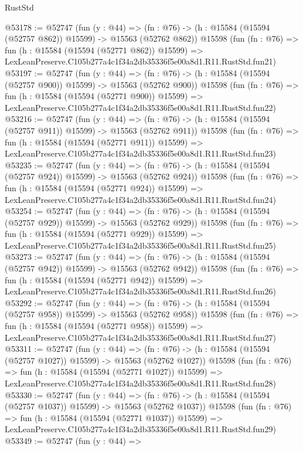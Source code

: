 \begin{lexlean}{RustStd}
\begin{coremodule}
@53178 := @52747
    (fun (y : @44) =>
    (fn : @76) -> (h : @15584 (@15594 (@52757 @862)) @15599) -> @15563 (@52762 @862))
    @15598
    (fun (fn : @76) =>
    fun (h : @15584 (@15594 (@52771 @862)) @15599) =>
    LexLeanPreserve.C105b277a4c1f34a2db35336f5e00a8d1.R11.RustStd.fun21)
@53197 := @52747
    (fun (y : @44) =>
    (fn : @76) -> (h : @15584 (@15594 (@52757 @900)) @15599) -> @15563 (@52762 @900))
    @15598
    (fun (fn : @76) =>
    fun (h : @15584 (@15594 (@52771 @900)) @15599) =>
    LexLeanPreserve.C105b277a4c1f34a2db35336f5e00a8d1.R11.RustStd.fun22)
@53216 := @52747
    (fun (y : @44) =>
    (fn : @76) -> (h : @15584 (@15594 (@52757 @911)) @15599) -> @15563 (@52762 @911))
    @15598
    (fun (fn : @76) =>
    fun (h : @15584 (@15594 (@52771 @911)) @15599) =>
    LexLeanPreserve.C105b277a4c1f34a2db35336f5e00a8d1.R11.RustStd.fun23)
@53235 := @52747
    (fun (y : @44) =>
    (fn : @76) -> (h : @15584 (@15594 (@52757 @924)) @15599) -> @15563 (@52762 @924))
    @15598
    (fun (fn : @76) =>
    fun (h : @15584 (@15594 (@52771 @924)) @15599) =>
    LexLeanPreserve.C105b277a4c1f34a2db35336f5e00a8d1.R11.RustStd.fun24)
@53254 := @52747
    (fun (y : @44) =>
    (fn : @76) -> (h : @15584 (@15594 (@52757 @929)) @15599) -> @15563 (@52762 @929))
    @15598
    (fun (fn : @76) =>
    fun (h : @15584 (@15594 (@52771 @929)) @15599) =>
    LexLeanPreserve.C105b277a4c1f34a2db35336f5e00a8d1.R11.RustStd.fun25)
@53273 := @52747
    (fun (y : @44) =>
    (fn : @76) -> (h : @15584 (@15594 (@52757 @942)) @15599) -> @15563 (@52762 @942))
    @15598
    (fun (fn : @76) =>
    fun (h : @15584 (@15594 (@52771 @942)) @15599) =>
    LexLeanPreserve.C105b277a4c1f34a2db35336f5e00a8d1.R11.RustStd.fun26)
@53292 := @52747
    (fun (y : @44) =>
    (fn : @76) -> (h : @15584 (@15594 (@52757 @958)) @15599) -> @15563 (@52762 @958))
    @15598
    (fun (fn : @76) =>
    fun (h : @15584 (@15594 (@52771 @958)) @15599) =>
    LexLeanPreserve.C105b277a4c1f34a2db35336f5e00a8d1.R11.RustStd.fun27)
@53311 := @52747
    (fun (y : @44) =>
    (fn : @76) -> (h : @15584 (@15594 (@52757 @1027)) @15599) -> @15563 (@52762 @1027))
    @15598
    (fun (fn : @76) =>
    fun (h : @15584 (@15594 (@52771 @1027)) @15599) =>
    LexLeanPreserve.C105b277a4c1f34a2db35336f5e00a8d1.R11.RustStd.fun28)
@53330 := @52747
    (fun (y : @44) =>
    (fn : @76) -> (h : @15584 (@15594 (@52757 @1037)) @15599) -> @15563 (@52762 @1037))
    @15598
    (fun (fn : @76) =>
    fun (h : @15584 (@15594 (@52771 @1037)) @15599) =>
    LexLeanPreserve.C105b277a4c1f34a2db35336f5e00a8d1.R11.RustStd.fun29)
@53349 := @52747
    (fun (y : @44) =>

\end{coremodule}
\end{lexlean}
